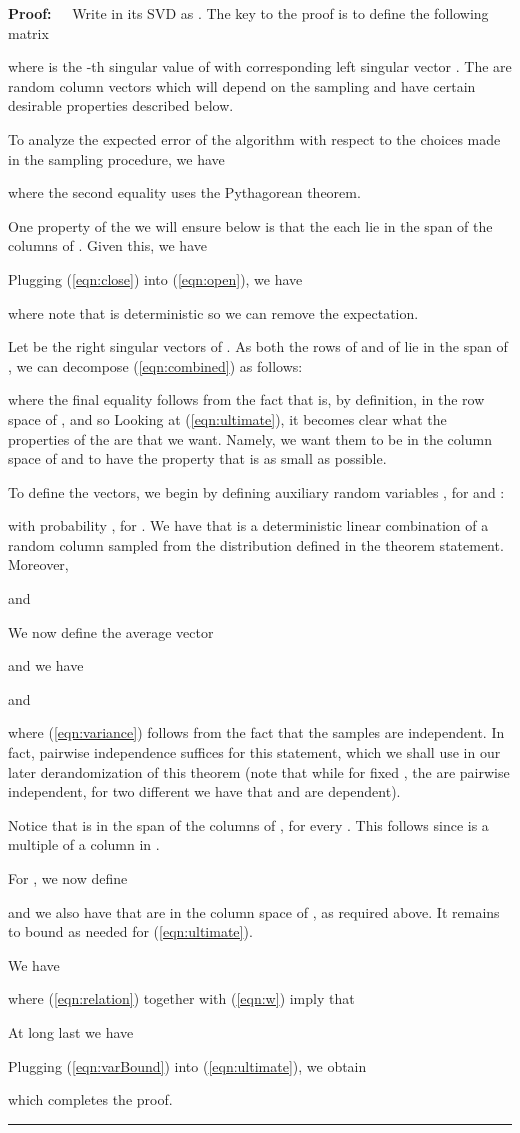 \documentclass[11pt]{article}
\newenvironment{proof}{\begin{trivlist} \item {\bf Proof:~~}}
  {\qed\end{trivlist}}
\def\qed{\hfill\rule{2mm}{2mm}}
\begin{document}
\begin{proof}
Write  in its SVD as . 
The key to the proof is to define the following matrix

where  is the -th singular value of  with corresponding
left singular vector . The  are random
column vectors which will depend on the sampling and have certain desirable properties described
below.  

To analyze the expected error of the algorithm with respect to the choices made in the sampling
procedure, we have

where the second equality uses the Pythagorean theorem. 

One property of the  we will ensure below is that the  each lie in the span of the columns
of . Given this, we have

Plugging (\ref{eqn:close}) into (\ref{eqn:open}), we have

where note that  is deterministic so we can remove the expectation. 

Let  be the right singular vectors of . As both the rows of
 and of  lie in the span of , we can decompose
(\ref{eqn:combined}) as follows:

where the final equality follows from the fact that  is, by definition, in the row space of , 
and so 
Looking at (\ref{eqn:ultimate}), it becomes clear what the properties of the  are that we want. Namely, 
we want them to be in the column space of  and to have the property that 
is as small as possible. 

To define the  vectors, we begin by defining auxiliary random variables ,
for  and :

with probability , for . 
We have that  is a deterministic linear combination of a random column sampled from the distribution
defined in the theorem statement. Moreover,

and

We now define the average vector

and we have

and

where (\ref{eqn:variance}) follows from the fact that the samples are independent. In fact, pairwise independence
suffices for this statement, which we shall use in our later derandomization of this theorem
(note that while for
fixed , the  are pairwise independent, for two different  we have that  
and  are dependent). 

Notice that  is in the span of the columns of , for every .
This follows since  is a multiple of a column in . 

For , we now define

and we also have that  are in the column space of , as required above. It remains
to bound  as needed for (\ref{eqn:ultimate}). 

We have

where (\ref{eqn:relation}) together with (\ref{eqn:w}) imply that

At long last we have

Plugging (\ref{eqn:varBound}) into (\ref{eqn:ultimate}), we obtain

which completes the proof. 
\end{proof}
\end{document}
